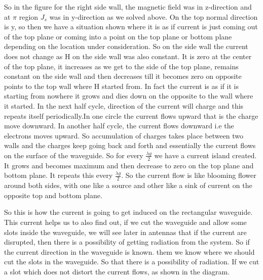 So in the figure for the right side wall, the magnetic field was in z-direction and at $\pi$ region $J_{s}$ was in y-direction as we solved above. On the top normal direction is y, so then we have a situation shown where it is as if current is just coming out of the top plane or coming into a point on the top plane or bottom plane depending on the location under consideration. So on the side wall the current does not change as H on the side wall was also constant. It is zero at the center of the top plane, it increases as we get to the side of the top plane, remains constant on the side wall and then decreases till it becomes zero on opposite points to the top wall where H started from. In fact the current is as if it is starting from nowhere it grows and dies down on the opposite to the wall where it started. In the next half cycle, direction of the current will charge and this repeats itself periodically.In one circle the current flows upward that is the charge move downward. In another half cycle, the current flows downward i.e the electrons moves upward. So accumulation of charges takes place between two walls and the charges keep going back and forth and essentially the current flows on the surface of the waveguide. So for every $\frac{\lambda g}{2}$ we have a current island created. It grows and becomes maximum and then decrease to zero on the top plane and bottom plane. It repeats this every $\frac{\lambda g}{2}$. So the current flow is like blooming flower around both sides, with one like a source and other like a sink of current on the opposite top and bottom plane.
	
So this is how the current is going to get induced on the rectangular waveguide. This current helps us to also find out, if we cut the waveguide and allow some slots inside the waveguide, we will see later in antennas that if the current are disrupted, then there is a possibility of getting radiation from the system. So if the current direction in the waveguide is known. them we know where we should cut the slots in the waveguide. So that there is a possibility of radiation. If we cut a slot which does not distort the current flows, as shown in the diagram.


